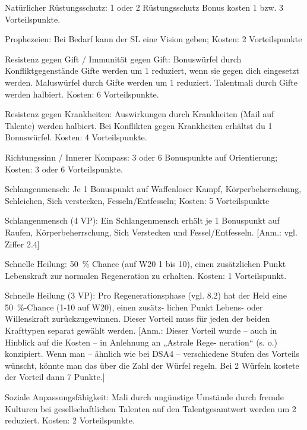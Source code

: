 \begin{description}
\item{Natürlicher Rüstungsschutz:} 1 oder 2 Rüstungsschutz Bonus kosten 1 bzw. 3 Vorteilspunkte.

\item{Prophezeien:} Bei Bedarf kann der SL eine Vision geben; Kosten: 2 Vorteilspunkte

\item{Resistenz gegen Gift / Immunität gegen Gift:} Bonuswürfel durch Konfliktgegenstände Gifte werden um 1 reduziert, wenn sie gegen dich eingesetzt werden. Maluswürfel durch Gifte werden um 1 reduziert. Talentmali durch Gifte werden halbiert. Kosten: 6 Vorteilspunkte.

\item{Resistenz gegen Krankheiten:} Auswirkungen durch Krankheiten (Mail auf Talente) werden halbiert. Bei Konflikten gegen Krankheiten erhältst du 1 Bonuswürfel. Kosten: 4 Vorteilspunkte.

\item{Richtungssinn / Innerer Kompass:} 3 oder 6 Bonuspunkte auf Orientierung; Kosten: 3 oder 6 Vorteilspunkte.

\item{Schlangenmensch:} Je 1 Bonuspunkt auf Waffenloser Kampf, Körperbeherrschung, Schleichen, Sich verstecken, Fesseln/Entfesseln; Kosten: 5 Vorteilspunkte

\item{Schlangenmensch (4 VP):} Ein Schlangenmensch erhält je 1 Bonuspunkt auf Raufen, Körperbeherrschung, Sich Verstecken und Fessel/Entfesseln. [Anm.: vgl. Ziffer 2.4]

\item{Schnelle Heilung:} 50~\% Chance (auf W20 1 bis 10), einen zusätzlichen Punkt Lebenskraft zur normalen Regeneration zu erhalten. Kosten: 1 Vorteilspunkt.

\item{Schnelle Heilung (3 VP):} Pro Regenerationsphase (vgl. 8.2) hat der Held eine 50~\%-Chance (1-10 auf W20), einen zusätz- lichen Punkt Lebens- oder Willenskraft zurückzugewinnen. Dieser Vorteil muss für jeden der beiden Krafttypen separat gewählt werden. [Anm.: Dieser Vorteil wurde – auch in Hinblick auf die Kosten – in Anlehnung an „Astrale Rege- neration“ (s. o.) konzipiert. Wenn man – ähnlich wie bei DSA4 – verschiedene Stufen des Vorteils wünscht, könnte man das über die Zahl der Würfel regeln. Bei 2 Würfeln kostete der Vorteil dann 7 Punkte.]

\item{Soziale Anpassungsfähigkeit:} Mali durch ungünstige Umstände durch fremde Kulturen bei gesellschaftlichen Talenten auf den Talentgesamtwert werden um 2 reduziert. Kosten: 2 Vorteilspunkte.


\end{description}
